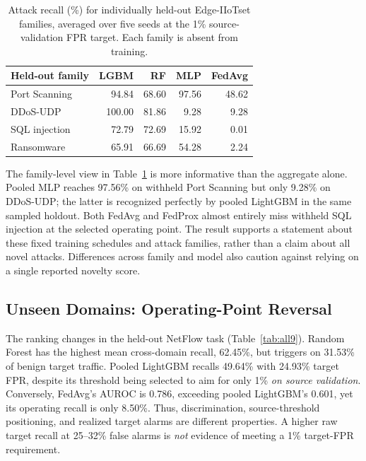 \documentclass[journal,10pt]{IEEEtran}
\begin{document}
\begin{table}[t]
\centering
\caption{Attack recall (\%) for individually held-out Edge-IIoTset families, averaged over five seeds at the 1\% source-validation FPR target. Each family is absent from training.}
\label{tab:attack_family}
\scriptsize\setlength{\tabcolsep}{3.5pt}
\begin{tabular}{@{}lrrrr@{}}
\toprule
\textbf{Held-out family} & \textbf{LGBM} & \textbf{RF} & \textbf{MLP} & \textbf{FedAvg}\\
\midrule
Port Scanning & 94.84 & 68.60 & 97.56 & 48.62\\
DDoS-UDP & 100.00 & 81.86 & 9.28 & 9.28\\
SQL injection & 72.79 & 72.69 & 15.92 & 0.01\\
Ransomware & 65.91 & 66.69 & 54.28 & 2.24\\
\bottomrule
\end{tabular}
\end{table}

The family-level view in Table~\ref{tab:attack_family} is more informative than the aggregate alone. Pooled MLP reaches 97.56\% on withheld Port Scanning but only 9.28\% on DDoS-UDP; the latter is recognized perfectly by pooled LightGBM in the same sampled holdout. Both FedAvg and FedProx almost entirely miss withheld SQL injection at the selected operating point. The result supports a statement about these fixed training schedules and attack families, rather than a claim about all novel attacks. Differences across family and model also caution against relying on a single reported novelty score.

\subsection{Unseen Domains: Operating-Point Reversal}
The ranking changes in the held-out NetFlow task (Table~\ref{tab:all9}). Random Forest has the highest mean cross-domain recall, 62.45\%, but triggers on 31.53\% of benign target traffic. Pooled LightGBM recalls 49.64\% with 24.93\% target FPR, despite its threshold being selected to aim for only 1\% \emph{on source validation}. Conversely, FedAvg's AUROC is 0.786, exceeding pooled LightGBM's 0.601, yet its operating recall is only 8.50\%. Thus, discrimination, source-threshold positioning, and realized target alarms are different properties. A higher raw target recall at 25--32\% false alarms is \emph{not} evidence of meeting a 1\% target-FPR requirement.
\end{document}
